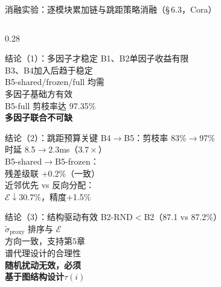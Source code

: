 \documentclass[aspectratio=169,9pt,xcolor=dvipsnames]{beamer}
\newcommand{\highlight}[1]{\textcolor{myred}{\textbf{#1}}}
\newcommand{\green}[1]{\textcolor{mygreen}{#1}}
\begin{document}
\begin{frame}{消融实验：逐模块累加链与跳距策略消融（§\,6.3，Cora）}
\begin{columns}[T]
\begin{column}{0.28\textwidth}
  \small
  \begin{block}{结论（1）：多因子才稳定}
    B1、B2单因子收益有限\\
    B3、B4加入后趋于稳定\\
    B5-shared/frozen/full 均需\\
    多因子基础方有效\\
    B5-full 剪枝率达 \green{97.35\%}\\[2pt]
    \highlight{多因子联合不可缺}
  \end{block}

  \begin{block}{结论（2）：跳距预算关键}
    B4$\to$B5：剪枝率 83\%$\to$97\%\\
    时延 8.5$\to$2.3ms（$3.7\times$）\\
    B5-shared$\to$B5-frozen：\\
    残差级联 \green{+0.2\%}（一致）\\
    近邻优先 vs 反向分配：\\
    $\mathcal{E}{\downarrow}30.7\%$，精度+1.5\%
  \end{block}

  \begin{alertblock}{结论（3）：结构驱动有效}
    B2-RND$<$B2（87.1 vs 87.2\%）\\
    $\widetilde{\sigma}_{\mathrm{proxy}}$ 排序与 $\mathcal{E}$\\
    方向一致，支持第5章\\
    谱代理设计的合理性\\[2pt]
    \textbf{随机扰动无效，必须\\基于图结构设计$\tau(i)$}
  \end{alertblock}
\end{column}
\end{columns}
\end{frame}
\end{document}
